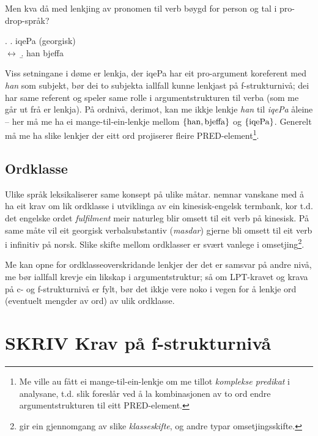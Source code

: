 \documentclass[11pt,a4paper,oneside,draft]{book}
\begin{document}
Men kva då med lenkjing av pronomen til verb bøygd for person og tal i
pro-drop-språk?

\ex. \a. iqePa                                  \hfill{} (georgisk) \\
     $\leftrightarrow$
     \b. han bjeffa

Viss setningane i døme \Last er lenkja, der iqePa har eit pro-argument
koreferent med \emph{han} som subjekt, bør dei to subjekta iallfall kunne
lenkjast på f-strukturnivå; dei har same referent og speler same rolle
i argumentstrukturen til verba (som me går ut frå er lenkja). På
ordnivå, derimot, kan me ikkje lenkje \emph{han} til \emph{iqePa} åleine -- her
må me ha ei mange-til-ein-lenkje mellom $\{ \rm han, bjeffa \}$ og $\{
\rm iqePa \}$. 
Generelt må me ha slike lenkjer der eitt ord projiserer fleire
PRED-element\footnote{Me ville au fått ei mange-til-ein-lenkje om me tillot
        \emph{komplekse predikat} i analysane, t.d. slik
        \citet{butt1998merger} foreslår ved å la kombinasjonen av to
        ord endre argumentstrukturen til eitt PRED-element. }.

\subsection{Ordklasse}
\label{sec-3.5.1}

Ulike språk leksikaliserer same konsept på ulike
måtar. \citet[s.~3]{cheung2002scg} nemnar vanskane med å ha eit krav
om lik ordklasse i utviklinga av ein kinesisk-engelsk termbank, kor
t.d. det engelske ordet \emph{fulfilment} meir naturleg blir omsett til eit
verb på kinesisk. På same måte vil eit georgisk verbalsubstantiv
(\emph{masdar}) gjerne bli omsett til eit verb i infinitiv på
norsk. Slike skifte mellom ordklasser er svært vanlege i
omsetjing\footnote{\citet[Catford~(1965),~i][s.~61]{munday2001its} gir ein gjennomgang av
       slike \emph{klasseskifte}, og andre typar omsetjingsskifte. }.

Me kan opne for ordklasseoverskridande lenkjer der det er samsvar på
andre nivå, me bør iallfall krevje ein likskap i argumentstruktur; så
om LPT-kravet og krava på c- og f-strukturnivå er fylt, bør det ikkje
vere noko i vegen for å lenkje ord (eventuelt mengder av ord) av ulik
ordklasse.


\section{\textbf{SKRIV} Krav på f-strukturnivå}
\label{sec-3.6}
\end{document}
